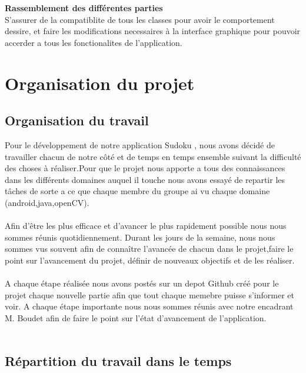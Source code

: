 \documentclass{article}
\begin{document}
\textbf{Rassemblement des différentes parties}\\
S'assurer de la compatiblite de tous les classes pour avoir le comportement dessire, et faire les modifications necessaires à la interface graphique pour pouvoir accerder a tous les fonctionalites de l'application.

\newpage
\section{Organisation du projet}
\subsection{Organisation du travail}
Pour le développement de notre application Sudoku , nous avons décidé de travailler chacun de notre côté et de temps en temps ensemble suivant la difficulté des choses à réaliser.Pour que le projet nous apporte a tous des connaissances dans les différents domaines auquel il touche nous avons essayé de repartir les tâches de sorte a ce que chaque membre du groupe ai vu chaque domaine (android,java,openCV).\\\\
Afin d’être les plus efficace et d’avancer le plus rapidement possible nous nous sommes réunis
quotidiennement. Durant les jours de la semaine, nous nous sommes vus souvent afin de connaître l'avancée de chacun dans le projet,faire le point sur l’avancement du projet, définir de nouveaux objectifs et de les réaliser.\\\\
A chaque étape réalisée nous avons postés sur un depot Github créé pour le projet chaque nouvelle partie afin que tout chaque memebre puisse s'informer et voir.
A chaque étape importante nous nous sommes réunis avec notre encadrant M. Boudet afin de faire le point sur l’état d’avancement de l’application.\\\\

\subsection{Répartition du travail dans le temps}
\end{document}
